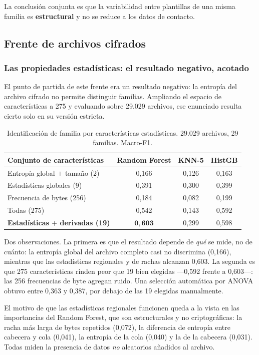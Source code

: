 \documentclass[11pt,a4paper]{article}
\begin{document}
La conclusión conjunta es que la variabilidad entre plantillas de una misma familia es
\textbf{estructural} y no se reduce a los datos de contacto.

\subsection{Frente de archivos cifrados}

\subsubsection{Las propiedades estadísticas: el resultado negativo, acotado}

El punto de partida de este frente era un resultado negativo: la entropía del archivo cifrado
no permite distinguir familias. Ampliando el espacio de características a 275 y evaluando
sobre 29.029 archivos, ese enunciado resulta cierto solo en su versión estricta.

\begin{table}[h]
\centering\small
\caption{Identificación de familia por características estadísticas. 29.029 archivos, 29
familias. Macro-F1.}
\begin{tabular}{@{}lccc@{}}
\toprule
\textbf{Conjunto de características} & \textbf{Random Forest} & \textbf{KNN-5} & \textbf{HistGB} \\
\midrule
Entropía global $+$ tamaño (2) & 0,166 & 0,126 & 0,163 \\
Estadísticas globales (9) & 0,391 & 0,300 & 0,399 \\
Frecuencia de bytes (256) & 0,184 & 0,082 & 0,199 \\
Todas (275) & 0,542 & 0,143 & 0,592 \\
\textbf{Estadísticas $+$ derivadas (19)} & $\mathbf{0{,}603}$ & 0,299 & 0,598 \\
\bottomrule
\end{tabular}
\end{table}

Dos observaciones. La primera es que el resultado depende de \emph{qué} se mide, no de cuánto:
la entropía global del archivo completo casi no discrimina (0,166), mientras que las
estadísticas regionales y de rachas alcanzan 0,603. La segunda es que 275 características
rinden peor que 19 bien elegidas ---0,592 frente a 0,603---: las 256 frecuencias de byte
agregan ruido. Una selección automática por ANOVA obtuvo entre 0,363 y 0,387, por debajo de
las 19 elegidas manualmente.

El motivo de que las estadísticas regionales funcionen queda a la vista en las importancias
del Random Forest, que son estructurales y no criptográficas: la racha más larga de bytes
repetidos (0,072), la diferencia de entropía entre cabecera y cola (0,041), la entropía de la
cola (0,040) y la de la cabecera (0,031). Todas miden la presencia de datos \emph{no}
aleatorios añadidos al archivo.
\end{document}

